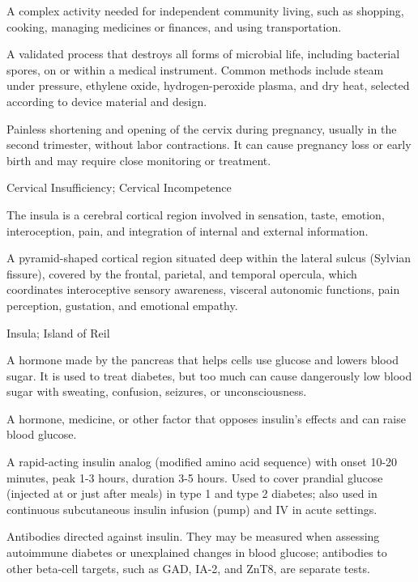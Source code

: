  A complex activity needed for independent community living, such as shopping, cooking, managing medicines or finances, and using transportation.

 A validated process that destroys all forms of microbial life, including bacterial
spores, on or within a medical instrument. Common methods include steam under pressure,
ethylene oxide, hydrogen-peroxide plasma, and dry heat, selected according to device
material and design.

 Painless shortening and opening of the cervix during pregnancy, usually in the second trimester, without labor contractions. It can cause pregnancy loss or early birth and may require close monitoring or treatment.

\synonyms
Cervical Insufficiency; Cervical Incompetence

 The insula is a cerebral cortical region involved in sensation, taste, emotion, interoception, pain, and integration of internal and external information.

 A pyramid-shaped cortical region situated deep within the lateral sulcus (Sylvian fissure), covered by the frontal, parietal, and temporal opercula, which coordinates interoceptive sensory awareness, visceral autonomic functions, pain perception, gustation, and emotional empathy.

\synonyms
Insula; Island of Reil

 A hormone made by the pancreas that helps cells use glucose and lowers blood sugar. It is used to treat diabetes, but too much can cause dangerously low blood sugar with sweating, confusion, seizures, or unconsciousness.

 A hormone, medicine, or other factor that opposes insulin’s effects and can raise blood glucose.

 A rapid-acting insulin analog (modified amino acid sequence) with onset 10-20 minutes,
peak 1-3 hours, duration 3-5 hours. Used to cover prandial glucose (injected at or just
after meals) in type 1 and type 2 diabetes; also used in continuous subcutaneous insulin
infusion (pump) and IV in acute settings.

 Antibodies directed against insulin. They may be measured when assessing autoimmune diabetes or unexplained changes in blood glucose; antibodies to other beta-cell targets, such as GAD, IA-2, and ZnT8, are separate tests.

